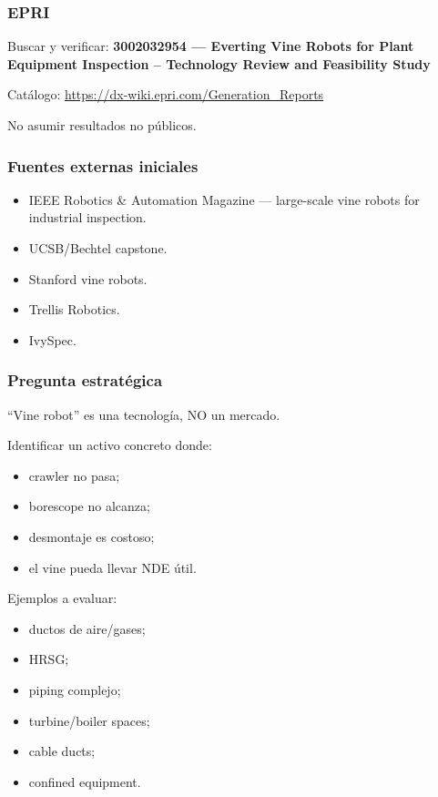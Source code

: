 \documentclass[11pt,a4paper]{article}
\begin{document}
\subsubsection*{EPRI}
Buscar y verificar:
\textbf{3002032954 — Everting Vine Robots for Plant Equipment Inspection – Technology Review and Feasibility Study}

Catálogo:
\url{https://dx-wiki.epri.com/Generation_Reports}

No asumir resultados no públicos.


\subsubsection*{Fuentes externas iniciales}
\begin{itemize}
\item IEEE Robotics \& Automation Magazine — large-scale vine robots for industrial inspection.
\item UCSB/Bechtel capstone.
\item Stanford vine robots.
\item Trellis Robotics.
\item IvySpec.
\end{itemize}


\subsubsection*{Pregunta estratégica}
``Vine robot'' es una tecnología, NO un mercado.

Identificar un activo concreto donde:

\begin{itemize}
\item crawler no pasa;
\item borescope no alcanza;
\item desmontaje es costoso;
\item el vine pueda llevar NDE útil.
\end{itemize}

Ejemplos a evaluar:

\begin{itemize}
\item ductos de aire/gases;
\item HRSG;
\item piping complejo;
\item turbine/boiler spaces;
\item cable ducts;
\item confined equipment.
\end{itemize}
\end{document}
